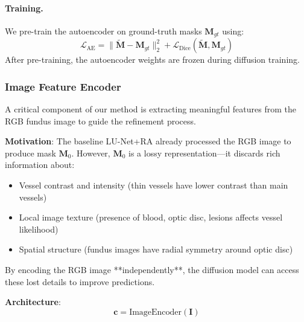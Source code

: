 \documentclass[11pt]{article}
\begin{document}
\paragraph{Training.}
We pre-train the autoencoder on ground-truth masks $\mathbf{M}_{gt}$ using:
\begin{equation}
\mathcal{L}_{\text{AE}} =
\|\tilde{\mathbf{M}}-\mathbf{M}_{gt}\|_2^2 +
\mathcal{L}_{\text{Dice}}(\tilde{\mathbf{M}}, \mathbf{M}_{gt})
\end{equation}
After pre-training, the autoencoder weights are frozen during diffusion training.

\subsubsection{Image Feature Encoder}

A critical component of our method is extracting meaningful features from the RGB fundus image to guide the refinement process.

\textbf{Motivation}: The baseline LU-Net+RA already processed the RGB image to produce mask $\mathbf{M}_0$. However, $\mathbf{M}_0$ is a lossy representation—it discards rich information about:
\begin{itemize}
    \item Vessel contrast and intensity (thin vessels have lower contrast than main vessels)
    \item Local image texture (presence of blood, optic disc, lesions affects vessel likelihood)
    \item Spatial structure (fundus images have radial symmetry around optic disc)
\end{itemize}

By encoding the RGB image **independently**, the diffusion model can access these lost details to improve predictions.

\textbf{Architecture}: 
\begin{equation}
\mathbf{c} = \text{ImageEncoder}(\mathbf{I})
\end{equation}
\end{document}
